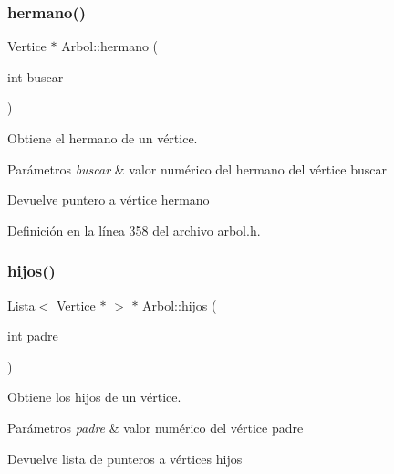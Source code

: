 \mbox{\label{classArbol_a59ae16f1a68c5e5afd08be20dcbf5717}} 
\subsubsection{\texorpdfstring{hermano()}{hermano()}}
{\footnotesize\ttfamily Vertice $\ast$ Arbol\+::hermano (\begin{DoxyParamCaption}\item[{int}]{buscar }\end{DoxyParamCaption})}



Obtiene el hermano de un vértice. 


\begin{DoxyParams}{Parámetros}
{\em buscar} & valor numérico del hermano del vértice buscar \\
\hline
\end{DoxyParams}
\begin{DoxyReturn}{Devuelve}
puntero a vértice hermano 
\end{DoxyReturn}


Definición en la línea 358 del archivo arbol.\+h.

\mbox{\label{classArbol_ac2bfb4e9bab05342fb7d627fe3916183}} 
\subsubsection{\texorpdfstring{hijos()}{hijos()}\hspace{0.1cm}{\footnotesize\ttfamily [1/2]}}
{\footnotesize\ttfamily Lista$<$ Vertice $\ast$ $>$ $\ast$ Arbol\+::hijos (\begin{DoxyParamCaption}\item[{int}]{padre }\end{DoxyParamCaption})}



Obtiene los hijos de un vértice. 


\begin{DoxyParams}{Parámetros}
{\em padre} & valor numérico del vértice padre \\
\hline
\end{DoxyParams}
\begin{DoxyReturn}{Devuelve}
lista de punteros a vértices hijos 
\end{DoxyReturn}


